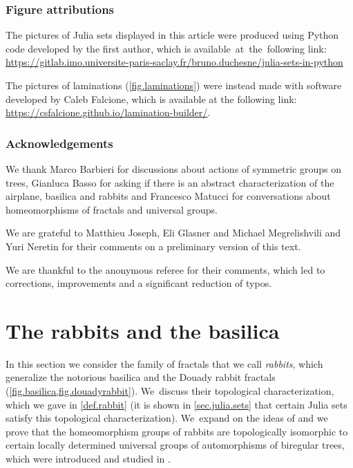 \documentclass[JEP,XML,SOM,Unicode,NoFloatCountersInSection,published]{cedram}
\theoremstyle{plain}
\theoremstyle{definition}
\theoremstyle{remark}
\begin{document}
\subsubsection*{Figure attributions}

The pictures of Julia sets displayed in this article were produced using Python code developed by the first author, which is available~at~the~fol\-low\-ing link:
\url{https://gitlab.imo.universite-paris-saclay.fr/bruno.duchesne/julia-sets-in-python}

The pictures of laminations (\cref{fig.laminations}) were instead made with software developed by Caleb Falcione, which is available at the following link:
\url{https://csfalcione.github.io/lamination-builder/}.

\subsubsection*{Acknowledgements}

We thank Marco Barbieri for discussions about actions of symmetric groups on trees, Gianluca Basso for asking if there is an abstract characterization of the airplane, basilica and rabbits and Francesco Matucci for conversations about homeomorphisms of fractals and universal groups.

We are grateful to Matthieu Joseph, Eli Glasner and Michael Megrelishvili and Yuri Neretin for their comments on a preliminary version of this text.

We are thankful to the anonymous referee for their comments, which led to corrections, improvements and a significant reduction of typos.


\section{The rabbits and the basilica}
\label{sec.rabbits}

In this section we consider the family of fractals that we call \textit{rabbits}, which generalize the notorious basilica and the Douady rabbit fractals (\cref{fig.basilica,fig.douadyrabbit}). We~discuss their topological characterization, which we gave in \cref{def.rabbit} (it is shown in \cref{sec.julia.sets} that certain Julia sets satisfy this topological characterization). We~expand on the ideas of \cite{Neretin} and we prove that the homeomorphism groups of rabbits are topologically isomorphic to certain locally determined universal groups of automorphisms of biregular trees, which were introduced and studied in \cite{biregular}.
\end{document}
